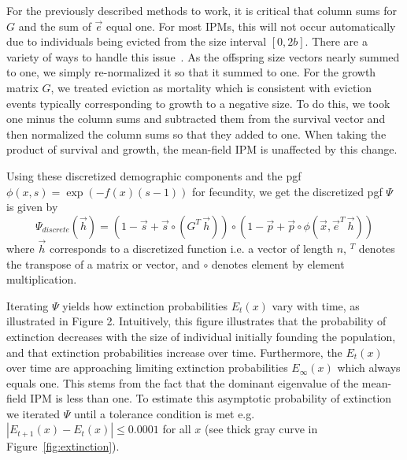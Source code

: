 \documentclass[12pt]{amsart}\usepackage[]{graphicx}\usepackage[]{color}
\begin{document}
For the previously described methods to work, it is critical that column sums for $G$ and the sum of $\vec e$ equal one. For most IPMs, this will not occur automatically due to individuals being evicted from the size interval $[0,2b]$. There are a variety of ways to handle this issue~\citep{williams-etal-12}. As the  offspring size vectors nearly summed to one, we simply re-normalized it so that it summed to one. For the growth matrix $G$, we treated eviction as mortality which is consistent with eviction events typically corresponding to growth to a negative size. To do this, we took one minus the column sums and subtracted them from the survival vector and then normalized the column sums so that they added to one. When taking the product of survival and growth, the mean-field IPM is unaffected by this change.

Using these discretized demographic components and the pgf $\phi(x,s)=\exp(-f(x)(s-1))$ for fecundity, we get the discretized pgf $\Psi$ is given by
\[
\Psi_{discrete}(\vec h)=(1-\vec s+\vec s\circ (G^T\, \vec h))\circ(1-\vec p+\vec p\circ \phi(\vec x,\vec e^T\,\vec h))
\]
where $\vec h$ corresponds to a discretized function i.e. a vector of length $n$, $^T$ denotes the transpose of a matrix or vector,  and $\circ$ denotes element by element multiplication.





Iterating $\Psi$ yields how extinction probabilities $E_t(x)$ vary with time, as illustrated in Figure 2. Intuitively, this figure illustrates that the probability of extinction decreases with the size of individual initially founding the population, and that extinction probabilities increase over time. Furthermore, the $E_t(x)$ over time are approaching limiting extinction probabilities $E_{\infty}(x)$ which always equals one. This stems from the fact that the dominant eigenvalue of the mean-field IPM is less than one. To estimate this asymptotic probability of extinction we  iterated $\Psi$ until a tolerance condition is met e.g. $|E_{t+1}(x)-E_t(x)|\le 0.0001$ for all $x$ (see thick gray curve in Figure~\ref{fig:extinction}).
\end{document}
